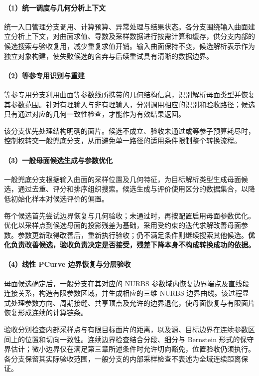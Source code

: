 \paragraph{（1）统一调度与几何分析上下文}
统一入口管理分支调用、计算预算、异常处理与结果状态。各分支围绕输入曲面建立分析上下文，对曲面求值、导数及采样数据进行按需计算和缓存，供分支内部的候选搜索与验收复用，减少重复求值开销。输入曲面保持不变，候选解析表示作为独立对象构建，使失败候选的舍弃与后续重试具有清晰的数据边界。

\paragraph{（2）等参专用识别与重建}
等参专用分支利用曲面等参数线所携带的几何结构信息，识别解析母面类型并恢复其参数范围。针对有理输入与非有理输入，分别调用相应的识别和验收路径；候选只有通过对应的几何一致性检查，才能作为有效结果返回。

该分支优先处理结构明确的面片。候选不成立、验收未通过或等参子预算耗尽时，控制权转交一般兜底分支，从而避免单一路径的适用条件限制整个转换流程。

\paragraph{（3）一般母面候选生成与参数优化}
一般兜底分支根据输入曲面的采样位置及几何特征，为目标解析类型生成母面候选，通过去重、评分和排序组织搜索。候选生成与评价使用区分的数据集合，以降低初始化样本对候选评价的偏置。

每个候选首先尝试边界恢复与几何验收；未通过时，再按配置启用母面参数优化。优化以采样点到候选母面的投影残差为基础，采用受约束的迭代求解改善母面参数。参数更新取得改善后，重新执行验收；仍不满足条件则继续搜索其他候选。\textbf{优化负责改善候选，验收负责决定是否接受，残差下降本身不构成转换成功的依据。}

\paragraph{（4）线性 PCurve 边界恢复与分层验收}
母面候选确定后，一般分支在其对应的 NURBS 参数域内恢复边界端点及直线段连接关系，构造有限参数区域，并生成相应的三维 NURBS 边界曲线。该过程显式处理参数方向、周期接缝、共享顶点及允许的边界退化，使母面恢复与有限面片恢复形成连续的计算链条。

验收分别检查内部采样点与有限目标面片的距离，以及源、目标边界在连续参数区间上的位置和切向一致性。连续边界检查结合分段、细分与 Bernstein 形式的保守界估计；微小边界仅在满足第三章所述条件时允许切向豁免，位置验收仍须执行。各分支保留其实际验收范围，一般分支的内部采样检查不表述为全域连续距离保证。

